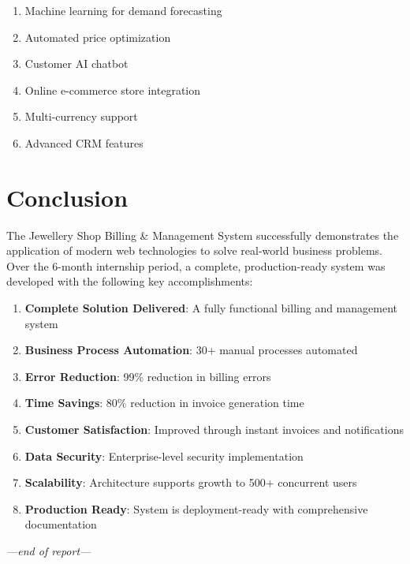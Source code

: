 \documentclass[12pt,a4paper]{report}
\begin{document}
\begin{enumerate}[label=\roman*)]
    \item Machine learning for demand forecasting
    \item Automated price optimization
    \item Customer AI chatbot
    \item Online e-commerce store integration
    \item Multi-currency support
    \item Advanced CRM features
\end{enumerate}
\pagebreak
\section{Conclusion}

The Jewellery Shop Billing \& Management System successfully demonstrates the application of modern web technologies to solve real-world business problems. Over the 6-month internship period, a complete, production-ready system was developed with the following key accomplishments:

\begin{enumerate}[label=\roman*)]
    \item \textbf{Complete Solution Delivered}: A fully functional billing and management system
    \item \textbf{Business Process Automation}: 30+ manual processes automated
    \item \textbf{Error Reduction}: 99\% reduction in billing errors
    \item \textbf{Time Savings}: 80\% reduction in invoice generation time
    \item \textbf{Customer Satisfaction}: Improved through instant invoices and notifications
    \item \textbf{Data Security}: Enterprise-level security implementation
    \item \textbf{Scalability}: Architecture supports growth to 500+ concurrent users
    \item \textbf{Production Ready}: System is deployment-ready with comprehensive documentation
\end{enumerate}

\vfill
\begin{center}
    \textit{---end of report---}
\end{center}
\end{document}
